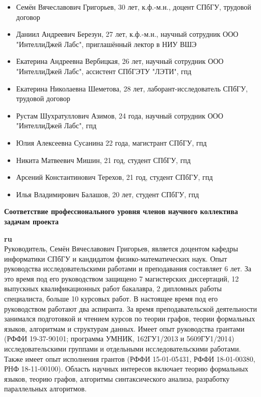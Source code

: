 \documentclass[12pt]{article}  %
\theoremstyle{remark}
\begin{document}
\begin{itemize}
  \item Семён Вячеславович Григорьев, 30 лет, к.ф.-м.н., доцент СПбГУ, трудовой договор
  \item Даниил Андреевич Березун, 27 лет, к.ф.-м.н.,
    научный сотрудник ООО "ИнтеллиДжей Лабс",
    приглашённый лектор в НИУ ВШЭ
  \item Екатерина Андреевна Вербицкая, 26 лет, научный сотрудник ООО "ИнтеллиДжей Лабс", ассистент СПбГЭТУ "ЛЭТИ", гпд
  \item Екатерина Николаевна Шеметова, 28 лет, лаборант-исследователь СПбГУ, трудовой договор
  \item Рустам Шухратуллович Азимов, 24 года, научный сотрудник ООО "ИнтеллиДжей Лабс", гпд
  \item Юлия Алексеевна Сусанина 22 года, магистрант СПбГУ, гпд
  \item Никита Матвеевич Мишин, 21 год, студент СПбГУ, гпд
  \item Арсений Константинович Терехов, 21 год, студент СПбГУ, гпд
  \item Илья Владимирович Балашов, 20 лет, студент СПбГУ, гпд
\end{itemize}



\textbf{Соответствие профессионального уровня членов научного коллектива задачам проекта}

\textbf{ru}\\
%
Руководитель, Семён Вячеславович Григорьев, является доцентом кафедры информатики СПбГУ и кандидатом физико-математических наук. Опыт руководства исследовательскими работами и преподавания составляет 6 лет. За это время под его руководством защищено 7 магистерских диссертаций, 12 выпускных квалификационных работ бакалавра, 2 дипломных работы специалиста, больше 10 курсовых работ. В настоящее время под его руководством работают два аспиранта. За время преподавательской деятельности занимался подготовкой и чтением курсов по теории графов, теории формальных языков, алгоритмам и структурам данных. Имеет опыт руководства грантами (РФФИ 19-37-90101; программа УМНИК, 162ГУ1/2013 и 5609ГУ1/2014) исследовательскими группами и отдельными исследовательскими работами. Также имеет опыт исполнения грантов (РФФИ 15-01-05431, РФФИ 18-01-00380, РНФ 18-11-00100). Область научных интересов включает теорию формальных языков, теорию графов, алгоритмы синтаксического анализа, разработку параллельных алгоритмов.
\end{document}
